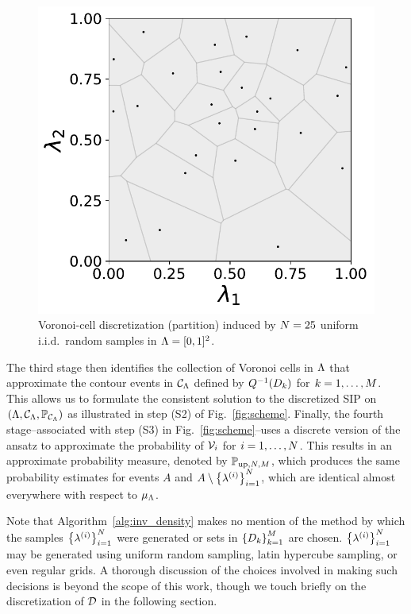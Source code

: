 \begin{figure}[ht]
\centering
	\begin{minipage}{.475\textwidth}
		\includegraphics[width=\linewidth]{./images/voronoi_diagrams/voronoi_diagram_N25_r0}
	\end{minipage}
\caption{
Voronoi-cell discretization (partition) induced by $N = 25 $ uniform i.i.d.~random samples in ${\Lambda} = [0,1]^2$.
}
\label{fig:voronoi_cells}
\end{figure}

The third stage then identifies the collection of Voronoi cells in ${\Lambda}$ that approximate the contour events in $\mathcal{C}_{{\Lambda}}$ defined by $Q^{-1}(D_k)$ for $k=1,\hdots,M$. This allows us to formulate the consistent solution to the discretized SIP on $({\Lambda}, \mathcal{C}_{{\Lambda}}, \operatorname*{\mathbb{P}_{\mathcal{C}_{{\Lambda}}}})$ as illustrated in step (S2) of Fig.~\ref{fig:scheme}.
Finally, the fourth stage\---associated with step (S3) in Fig.~\ref{fig:scheme}\---uses a discrete version of the ansatz to approximate the probability of $\mathcal{V}_i$ for $i=1,\dots,N$.
This results in an approximate probability measure, denoted by $\mathbb{P}_{\text{up},N,M}$, which produces the same probability estimates for events $A$ and $A\setminus \left\{ \lambda^{(i)} \right\}_{i=1}^N$, which are identical almost everywhere with respect to $\mu_{{\Lambda}}$.

Note that Algorithm~\ref{alg:inv_density} makes no mention of the method by which the samples $\left\{ \lambda^{(i)} \right\}_{i=1}^{N}$ were generated or sets in $\left\{D_k\right\}_{k=1}^{M}$ are chosen.
$\left\{ \lambda^{(i)} \right\}_{i=1}^{N}$ may be generated using uniform random sampling, latin hypercube sampling, or even regular grids.
A thorough discussion of the choices involved in making such decisions is beyond the scope of this work, though we touch briefly on the discretization of $\mathcal{D}$ in the following section.

\FloatBarrier
